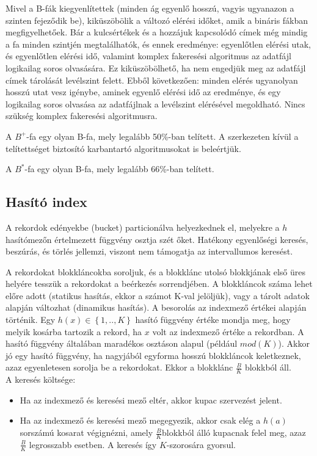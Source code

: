 \documentclass[margin=0px]{article}
\begin{document}
Mivel a B-fák kiegyenlítettek (minden ág egyenlő hosszú, vagyis ugyanazon a szinten fejeződik be),
kiküszöbölik a változó elérési időket, amik a bináris fákban megfigyelhetőek. Bár a kulcsértékek és a
hozzájuk kapcsolódó címek még mindig a fa minden szintjén megtalálhatók, és ennek eredménye:
egyenlőtlen elérési utak, és egyenlőtlen elérési idő, valamint komplex fakeresési algoritmus az
adatfájl logikailag soros olvasására. Ez kiküszöbölhető, ha nem engedjük meg az adatfájl címek
tárolását levélszint felett. Ebből következően: minden elérés ugyanolyan hosszú utat vesz igénybe,
aminek egyenlő elérési idő az eredménye, és egy logikailag soros olvasása az adatfájlnak a levélszint
elérésével megoldható. Nincs szükség komplex fakeresési algoritmusra.

A $B^{+}$-fa egy olyan B-fa, mely legalább 50\%-ban telített. A szerkezeten kívül a telítettséget biztosító
karbantartó algoritmusokat is beleértjük.

A $B^{*}$-fa egy olyan B-fa, mely legalább 66\%-ban telített.

\subsection{Hasító index}

A rekordok edényekbe (bucket) particionálva helyezkednek el, melyekre a $h$ hasítómezőn értelmezett
függvény osztja szét őket. Hatékony egyenlőségi keresés, beszúrás, és törlés jellemzi, viszont nem támogatja
az intervallumos keresést.

A rekordokat blokkláncokba soroljuk, és a blokklánc utolsó blokkjának
első üres helyére tesszük a rekordokat a beérkezés sorrendjében. A blokkláncok száma lehet előre adott
(statikus hasítás, ekkor a számot K-val jelöljük), vagy a tárolt adatok alapján változhat (dinamikus hasítás).
A besorolás az indexmező értékei alapján történik. Egy $h(x) \in \left\{1,..,K\right\}$ hasító függvény értéke mondja meg,
hogy melyik kosárba tartozik a rekord, ha $x$ volt az indexmező értéke a rekordban. A hasító függvény
általában maradékos osztáson alapul (például $mod(K)$). Akkor jó egy hasító függvény, ha nagyjából egyforma
hosszú blokkláncok keletkeznek, azaz egyenletesen sorolja be a rekordokat. Ekkor a blokklánc $\frac{B}{K}$ blokkból áll.\\

\noindent A keresés költsége:
\begin{itemize}
    \item	Ha az indexmező és keresési mező eltér, akkor kupac szervezést jelent.
    \item	Ha az indexmező és keresési mező megegyezik, akkor csak elég a $h(a)$ sorszámú kosarat végignézni,
          amely $\frac{B}{K}$blokkból álló kupacnak felel meg, azaz $\frac{B}{K}$ legrosszabb esetben.
          A keresés így $K$-szorosára gyorsul.
\end{itemize}
\end{document}
